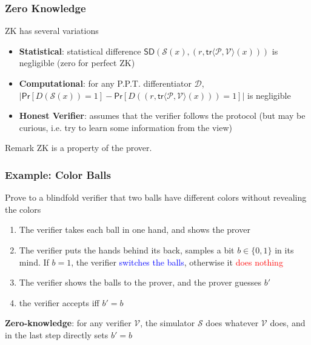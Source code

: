 \documentclass[handout]{beamer} %
\newcommand{\blue}[1]{\textcolor{blue}{#1}}
\newcommand{\dgreen}[1]{\textcolor{dgreen}{#1}}
\newcommand{\red}[1]{\textcolor{red}{#1}}
\begin{document}
\frame
{
  \frametitle{Zero Knowledge}
  \onslide<+-> ZK has several variations
  \begin{itemize}
    \item<+-> \textbf{Statistical}: statistical difference $\mathsf{SD}(\mathcal{S}(x),(r,\mathsf{tr}\langle\mathcal{P},\mathcal{V}\rangle(x)))$ is negligible (zero for perfect ZK)
    \item<+-> \textbf{Computational}: for any P.P.T. differentiator $\mathcal{D}$, $|\mathsf{Pr}[D(\mathcal{S}(x))=1]-\mathsf{Pr}[D((r,\mathsf{tr}\langle\mathcal{P},\mathcal{V}\rangle(x)))=1]|$ is negligible
    \item<+-> \textbf{Honest Verifier}: assumes that the verifier follows the protocol (but may be curious, i.e. try to learn some information from the view)
  \end{itemize}

  \onslide<+->\begin{block}{Remark}
  ZK is a property of the prover.
  \end{block}
}

\frame
{
  \frametitle{Example: Color Balls}
  \onslide<+-> Prove to a blindfold verifier that two balls have different \dgreen{colors} without revealing the colors
  \begin{enumerate}
    \item<+-> The verifier takes each ball in one hand, and shows the prover
    \item<+-> The verifier puts the hands behind its back, samples a bit $b\in\{0,1\}$ in its mind. If $b=1$, the verifier \blue{switches the balls}, otherwise it \red{does nothing}
    \item<+-> The verifier shows the balls to the prover, and the prover guesses $b'$
    \item<+-> the verifier \dgreen{accepts iff $b'=b$}
  \end{enumerate}
  \onslide<+->\textbf{Zero-knowledge}: for any verifier $\mathcal{V}$, the simulator $\mathcal{S}$ does whatever $\mathcal{V}$ does, and in the last step directly sets $b'=b$
}
\end{document}
